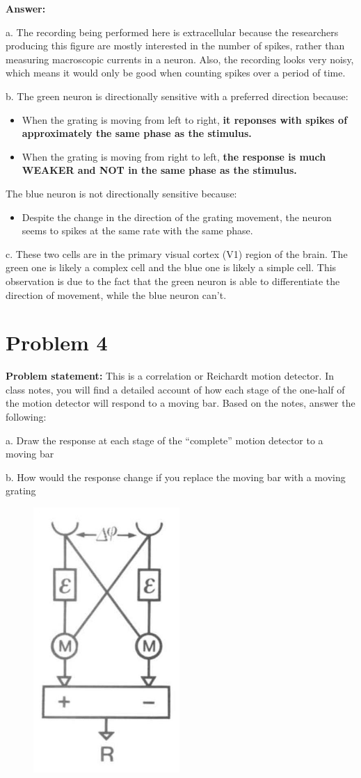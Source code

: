 \documentclass[letterpaper, 11pt]{article}
\begin{document}
\textbf{Answer:}

a. The recording being performed here is extracellular because the researchers producing this figure are mostly interested in the number of spikes, rather than measuring macroscopic currents in a neuron. Also, the recording looks very noisy, which means it would only be good when counting spikes over a period of time.

b. The green neuron is directionally sensitive with a preferred direction because: 
\begin{itemize}
	\item When the grating is moving from left to right, \textbf{it reponses with spikes of approximately the same phase as the stimulus. }
	\item When the grating is moving from right to left, \textbf{the response is much WEAKER and NOT in the same phase as the stimulus.}
\end{itemize}

The blue neuron is not directionally sensitive because: 
\begin{itemize}
	\item Despite the change in the direction of the grating movement, the neuron seems to spikes at the same rate with the same phase.
\end{itemize}

c. These two cells are in the primary visual cortex (V1) region of the brain. The green one is likely a complex cell and the blue one is likely a simple cell. This observation is due to the fact that the green neuron is able to differentiate the direction of movement, while the blue neuron can't.


\section{Problem 4}
\label{sec:prob4}
\textbf{Problem statement:} This is a correlation or Reichardt motion detector. In class notes, you will find a detailed account of how each stage of the one-half of the motion detector will respond to a moving bar. Based on the notes, answer the following:

a. Draw the response at each stage of the “complete” motion detector to a moving bar

b. How would the response change if you replace the moving bar with a moving grating

\begin{figure}[htb!]
	\centering
	\includegraphics[width=0.2\linewidth]{fig4.png}
	\label{fig4}
\end{figure}
\end{document}
